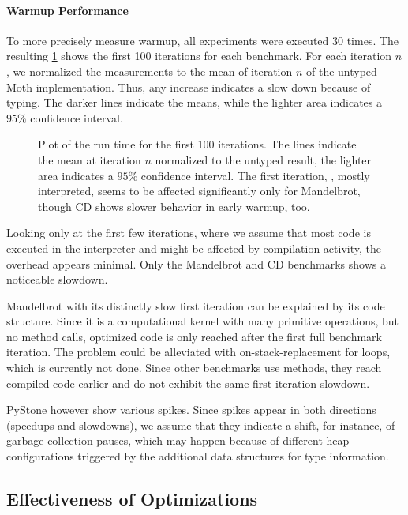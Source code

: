 \paragraph*{Warmup Performance}

To more precisely measure warmup, all experiments were executed 30 times.
The resulting \cref{fig:typing-warmup} shows the first 100 iterations for each benchmark.
For each iteration $n$, we normalized the measurements to the mean of iteration $n$
of the untyped Moth implementation.
Thus, any increase indicates a slow down because of typing.
The darker lines indicate the means, while the lighter area indicates
a $95\%$ confidence interval.

\begin{figure}[htb]
  \centering
  \TypingWarmupConfInterval{}
	\caption{Plot of the run time for the first 100 iterations.
           The lines indicate the mean at iteration $n$ normalized
           to the untyped result, the lighter area indicates a $95\%$ confidence interval.
           The first iteration, \ie, mostly interpreted, seems
           to be affected significantly only for Mandelbrot, though
           CD shows slower behavior in early warmup, too.}
	\label{fig:typing-warmup}
\end{figure}

Looking only at the first few iterations,
where we assume that most code is executed in the interpreter and might be
affected by compilation activity,
the overhead appears minimal.
Only the Mandelbrot and CD benchmarks shows a noticeable slowdown.

Mandelbrot with its distinctly slow first iteration
can be explained by its code structure.
Since it is a computational kernel with many primitive operations,
but no method calls, optimized code is only reached after the first full
benchmark iteration.
The problem could be alleviated with on-stack-replacement
for loops, which is currently not done.
Since other benchmarks use methods, they reach compiled code earlier
and do not exhibit the same first-iteration slowdown.

PyStone however show various spikes.
Since spikes appear in both directions (speedups and slowdowns),
we assume that they indicate a shift,
for instance, of garbage collection pauses,
which may happen because of different heap configurations
triggered by the additional data structures for type information.

\subsection{Effectiveness of Optimizations}

